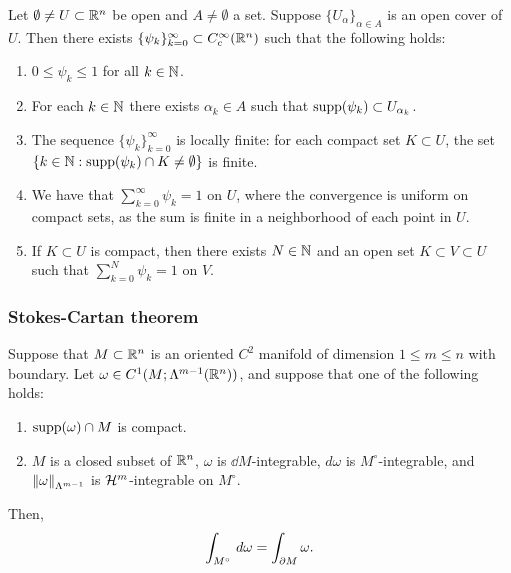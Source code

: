 \documentclass[a4paper]{article}
\renewcommand{\suminfk}{\sum_{k=0}^\infty}
\renewcommand{\seqinfk}[1]{\{ #1 \}_{k=0}^\infty}
\renewcommand{\sumk}{\sum_{k=0}}
\begin{document}
\begin{thm}
  Let $\emptyset \neq U \subset \mathbb{R}^n$ be open and $A \neq
    \emptyset$ a set. Suppose $\{U_\alpha\}_{\alpha \in A}$
  is an open cover of $U$. Then there exists
  $\seqinfk{\psi_k} \subset C_c^\infty (\R^n)$ such that
  the following holds:
  \begin{enumerate}
    \item $0 \leq \psi_k \leq 1$ for all $k \in \mathbb{N}$.

    \item For each $k \in \mathbb{N}$ there exists $\alpha_k \in A$ such that
          $\operatorname{supp} (\psi_k) \subset U_{\alpha_k}$.

    \item The sequence $\seqinfk{\psi_k}$ is locally finite: for each
          compact set $K \subset U$, the set $\{k \in \mathbb{N}: \operatorname{supp}(\psi_k)
          \cap K \neq \emptyset\}$ is finite.

    \item We have that $\suminfk \psi_k = 1$ on $U$, where the convergence
          is uniform on compact sets, as the sum is finite in a
          neighborhood of each point in $U$.

    \item If $K \subset U$ is compact, then there exists $N \in \mathbb{N}$ and an
          open set $K \subset V \subset U$ such that $\sumk^N \psi_k = 1$
          on $V$.
  \end{enumerate}
\end{thm}

\subsubsection{Stokes-Cartan theorem}

\begin{thm}
  Suppose that $M \subset \mathbb{R}^n$ is an oriented $C^2$ manifold
  of dimension $1 \leq m \leq n$ with boundary. Let $\omega
    \in C^1 (M; \Lambda^{m-1} (\mathbb{R}^n))$, and suppose that one of
  the following holds:
  \begin{enumerate}
    \item $\operatorname{supp} (\omega) \cap M$ is compact.
    \item $M$ is a closed subset of $\mathbb{R}^n$, $\omega$ is
          $\dd M$-integrable, $d \omega$ is $M^\circ$-integrable,
          and $\left\lVert \omega\right\rVert_{\Lambda^{m-1}}$ is $\mathcal{H}^m$-integrable
          on $M^\circ$.
  \end{enumerate}
  Then,
  \[
    \int_{M^\circ} \, d \omega = \int_{\partial M} \omega.
  \]
\end{thm}
\end{document}
